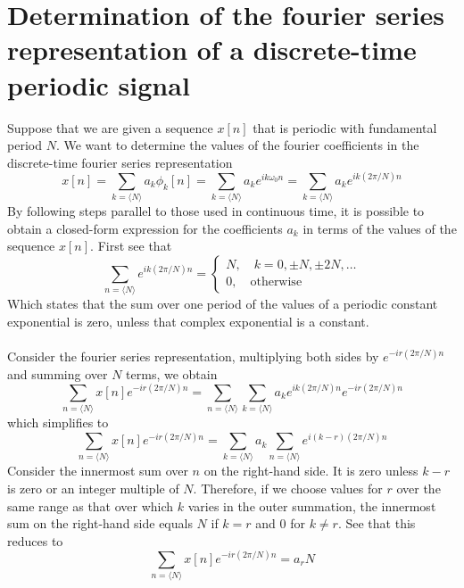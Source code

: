 \documentclass{report}
\begin{document}
\section{Determination of the fourier series\\representation of a discrete-time periodic signal}
Suppose that we are given a sequence $x[n]$ that is periodic with fundamental period $N$. We want to determine the values of the fourier coefficients in the discrete-time fourier series representation
\begin{equation*}
x[n]=\sum_{k=\langle N\rangle}a_k\phi_k[n]=\sum_{k=\langle N\rangle}a_ke^{ik\omega_0n}=\sum_{k=\langle N\rangle}a_ke^{ik(2\pi/N)n}
\end{equation*}
By following steps parallel to those used in continuous time, it is possible to obtain a closed-form expression for the coefficients $a_k$ in terms of the values of the sequence $x[n]$. First see that
\begin{equation*}
\sum_{n=\langle N\rangle}e^{ik(2\pi/N)n}=\begin{cases}
N,\quad k=0,\pm N,\pm 2N,\ldots\\
0,\quad \text{otherwise}
\end{cases}
\end{equation*}
Which states that the sum over one period of the values of a periodic constant exponential is zero, unless that complex exponential is a constant.\\
\vspace{1mm}\\
Consider the fourier series representation, multiplying both sides by $e^{-ir(2\pi/N)n}$ and summing over $N$ terms, we obtain 
\begin{equation*}
\sum_{n=\langle N\rangle}x[n]e^{-ir(2\pi/N)n}=\sum_{n=\langle N\rangle}\sum_{k=\langle N\rangle}a_ke^{ik(2\pi/N)n}e^{-ir(2\pi/N)n}
\end{equation*}
which simplifies to
\begin{equation*}
\sum_{n=\langle N\rangle}x[n]e^{-ir(2\pi/N)n}=\sum_{k=\langle N\rangle}a_k\sum_{n=\langle N\rangle}e^{i(k-r)(2\pi/N)n}
\end{equation*}
Consider the innermost sum over $n$ on the right-hand side. It is zero unless $k-r$ is zero or an integer multiple of $N$. Therefore, if we choose values for $r$ over the same range as that over which
$k$ varies in the outer summation, the innermost sum on the right-hand side equals $N$ if $k=r$ and 0 for $k\neq r$. See that this reduces to
\begin{equation*}
\sum_{n=\langle N\rangle}x[n]e^{-ir(2\pi/N)n}=a_rN
\end{equation*}
\end{document}
